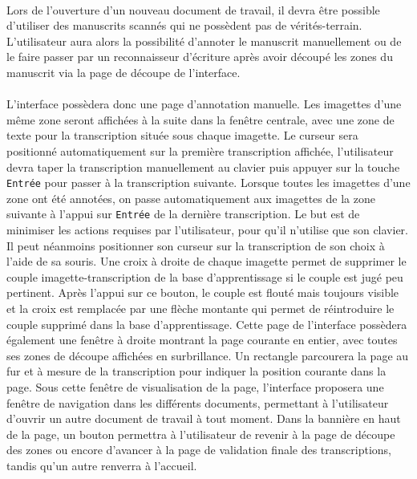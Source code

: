 \paragraph{}
Lors de l’ouverture d’un nouveau document de travail, il devra être possible d’utiliser des manuscrits scannés qui ne possèdent pas de vérités-terrain. L’utilisateur aura alors la possibilité d’annoter le manuscrit manuellement ou de le faire passer par un reconnaisseur d’écriture après avoir découpé les zones du manuscrit via la page de découpe de l’interface.

\paragraph{}
L’interface possèdera donc une page d’annotation manuelle. Les imagettes d’une même zone seront affichées à la suite dans la fenêtre centrale, avec une zone de texte pour la transcription située sous chaque imagette. Le curseur sera positionné automatiquement sur la première transcription affichée, l’utilisateur devra taper la transcription manuellement au clavier puis appuyer sur la touche \texttt{Entrée} pour passer à la transcription suivante. Lorsque toutes les imagettes d’une zone ont été annotées, on passe automatiquement aux imagettes de la zone suivante à l’appui sur \texttt{Entrée} de la dernière transcription. Le but est de minimiser les actions requises par l’utilisateur, pour qu’il n’utilise que son clavier. Il peut néanmoins positionner son curseur sur la transcription de son choix à l’aide de sa souris.
\newline{}
Une croix à droite de chaque imagette permet de supprimer le couple imagette-transcription de la base d’apprentissage si le couple est jugé peu pertinent. Après l’appui sur ce bouton, le couple est flouté mais toujours visible et la croix est remplacée par une flèche montante qui permet de réintroduire le couple supprimé dans la base d’apprentissage.
\newline{}
Cette page de l’interface possèdera également une fenêtre à droite montrant la page courante en entier, avec toutes ses zones de découpe affichées en surbrillance. Un rectangle parcourera la page au fur et à mesure de la transcription pour indiquer la position courante dans la page.
\newline{}
Sous cette fenêtre de visualisation de la page, l’interface proposera une fenêtre de navigation dans les différents documents, permettant à l’utilisateur d’ouvrir un autre document de travail à tout moment.
\newline{}
Dans la bannière en haut de la page, un bouton permettra à l’utilisateur de revenir à la page de découpe des zones ou encore d’avancer à la page de validation finale des transcriptions, tandis qu’un autre renverra à l’accueil.

